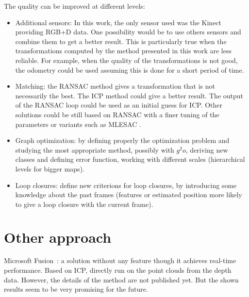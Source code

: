 The quality can be improved at different levels:
\begin{itemize}
\item Additional sensors: In this work, the only sensor used was the Kinect providing RGB+D data. One possibility would be to use others sensors and combine them to get a better result. This is particularly true when the transformations computed by the method presented in this work are less reliable. For example, when the quality of the transformations is not good, the odometry could be used assuming this is done for a short period of time.
\item Matching: the RANSAC method gives a transformation that is not necessarily the best. The ICP \cite{zhang_92_icp} method could give a better result. The output of the RANSAC loop could be used as an initial guess for ICP. Other solutions could be still based on RANSAC with a finer tuning of the parameters or variants such as MLESAC \cite{TorrZ00}.
\item Graph optimization: by defining properly the optimization problem and studying the most appropriate method, possibly with $g^2o$, deriving new classes and defining error function, working with different scales (hierarchical levels for bigger maps).
\item Loop closures: define new criterions for loop closures, by introducing some knowledge about the past frames (features or estimated position more likely to give a loop closure with the current frame).
\end{itemize}

\section{Other approach}

Microsoft Fusion~\cite{MSFusion}: a solution without any feature though it achieves real-time performance. Based on ICP, directly run on the point clouds from the depth data. However, the details of the method are not published yet. But the shown results seem to be very promising for the future.

